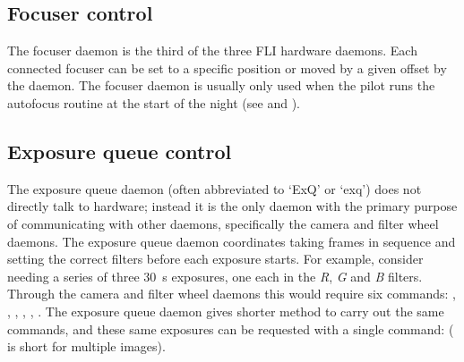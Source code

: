 \begin{colsection}
\begin{colsection}
\end{colsection}


\subsection{Focuser control}
\label{sec:foc}
\begin{colsection}

The focuser daemon is the third of the three FLI hardware daemons. Each connected focuser can be set to a specific position or moved by a given offset by the daemon. The focuser daemon is usually only used when the pilot runs the autofocus routine at the start of the night (see  and ).

\end{colsection}


\subsection{Exposure queue control}
\label{sec:exq}
\begin{colsection}

The exposure queue daemon (often abbreviated to `ExQ' or `exq') does not directly talk to hardware; instead it is the only daemon with the primary purpose of communicating with other daemons, specifically the camera and filter wheel daemons. The exposure queue daemon coordinates taking frames in sequence and setting the correct filters before each exposure starts. For example, consider needing a series of three \SI{30}{\second} exposures, one each in the \textit{R}, \textit{G} and \textit{B} filters. Through the camera and filter wheel daemons this would require six commands: , , , , , . The exposure queue daemon gives shorter method to carry out the same commands, and these same exposures can be requested with a single command:  ( is short for multiple images).


\end{colsection}
\end{colsection}
